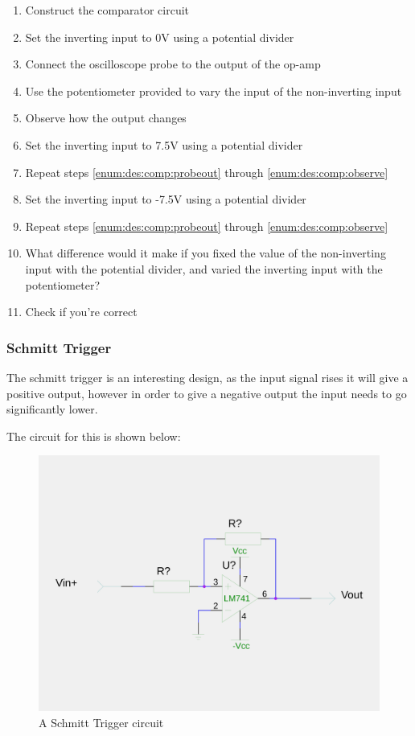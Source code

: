\begin{enumerate}
\item Construct the comparator circuit
\item Set the inverting input to 0V using a potential divider
\item \label{enum:des:comp:probeout} Connect the oscilloscope probe to the output of the op-amp
\item Use the potentiometer provided to vary the input of the non-inverting input
\item \label{enum:des:comp:observe} Observe how the output changes
\item Set the inverting input to 7.5V using a potential divider
\item Repeat steps \ref{enum:des:comp:probeout} through \ref{enum:des:comp:observe}
\item Set the inverting input to -7.5V using a potential divider
\item Repeat steps \ref{enum:des:comp:probeout} through \ref{enum:des:comp:observe}
\item What difference would it make if you fixed the value of the non-inverting input with the potential divider, and varied the inverting input with the potentiometer?
\item Check if you're correct
\end{enumerate}

\subsubsection{Schmitt Trigger}
The schmitt trigger is an interesting design, as the input signal rises it will give a positive output, however in order to give a negative output the input needs to go significantly lower.

The circuit for this is shown below:

\begin{figure}[H]
	\centering
	\includegraphics[width=\textwidth]{./images/schmitt.png}
	\caption{A Schmitt Trigger circuit}
	\label{fig:schmitt}
\end{figure}

